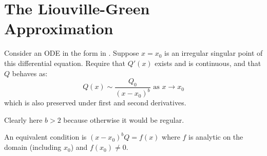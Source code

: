 \documentclass[../Main.tex]{subfiles}
\begin{document}
\section{The Liouville-Green Approximation}
Consider an ODE in the form in . Suppose $x = x_0$ is an irregular singular point of this differential equation. Require that $Q'(x)$ exists and is continuous, and that $Q$ behaves as:
\begin{equation*}
    Q(x) \sim \frac{Q_0}{(x - x_0)^b} \text{ as } x \to x_0
\end{equation*}
which is also preserved under first and second derivatives.

Clearly here $b > 2$ because otherwise it would be regular.

An equivalent condition is $(x - x_0)^b Q = f(x)$ where $f$ is analytic on the domain (including $x_0$) and $f(x_0) \neq 0$.
\end{document}
